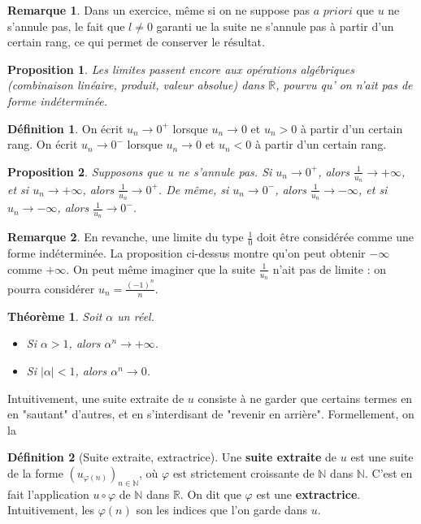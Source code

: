\documentclass[french]{book}
\newcommand{\N}{\mathbb{N}}
\newcommand{\R}{\mathbb{R}}
\theoremstyle{plain}
\newtheorem{thm}{Théorème}[chapter]
\newtheorem{prop}{Proposition}[chapter]
\theoremstyle{definition}
\newtheorem{dfn}{Définition}[chapter]
\newtheorem{rmq}{Remarque}[chapter]
\theoremstyle{remark}
\begin{document}
\begin{rmq}
	Dans un exercice, même si on ne suppose pas $a$ $priori$ que $u$ ne s'annule pas, le fait que $l\ne0$ garanti ue la suite ne s'annule pas à partir d'un certain rang, ce qui permet de conserver le résultat.
\end{rmq}
\begin{prop}
	Les limites passent encore aux opérations algébriques (combinaison linéaire, produit, valeur absolue) dans $\overline{\R}$, pourvu qu' on n'ait pas de forme indéterminée.
\end{prop}
\begin{dfn}
	On écrit $u_n\rightarrow0^+$ lorsque $u_n\rightarrow0$ et $u_n>0$ à partir d'un certain rang. On écrit $u_n\rightarrow0^-$ lorsque $u_n\rightarrow0$ et $u_n<0$ à partir d'un certain rang.
\end{dfn}
\begin{prop}
	Supposons que $u$ ne s'annule pas. Si $u_n\rightarrow0^+$, alors $\displaystyle\frac{1}{u_n}\rightarrow+\infty$, et si $u_n\rightarrow+\infty$, alors $\displaystyle\frac{1}{u_n}\rightarrow0^+$. De même, si $u_n\rightarrow0^-$, alors $\displaystyle\frac{1}{u_n}\rightarrow-\infty$, et si $u_n\rightarrow-\infty$, alors $\displaystyle\frac{1}{u_n}\rightarrow0^-
	$.
\end{prop}
\begin{rmq}
	En revanche, une limite du type $\displaystyle\frac10$ doit être considérée comme une forme indéterminée. La proposition ci-dessus montre qu'on peut obtenir $-\infty$ comme $+\infty$. On peut même imaginer que la suite $\displaystyle\frac{1}{u_n}$ n'ait pas de limite : on pourra considérer $\displaystyle u_n=\frac{(-1)^n}{n}$.
\end{rmq}
\begin{thm}
	Soit $\alpha$ un réel.
	\begin{itemize}
		\item Si $\alpha>1$, alors $\alpha^n\rightarrow+\infty$.
		\item Si $\lvert\alpha\rvert<1$, alors $\alpha^n\rightarrow0$.
	\end{itemize}
\end{thm}
Intuitivement, une suite extraite de $u$ consiste à ne garder que certains termes en en "sautant" d'autres, et en s'interdisant de "revenir en arrière". Formellement, on la 
\begin{dfn}[Suite extraite, extractrice]
	Une \textbf{suite extraite} de $u$ est une suite de la forme $(u_{\varphi(n)})_{n\in\N}$, où $\varphi$ est strictement croissante de $\N$ dans $\N$. C'est en fait l'application $u\circ\varphi$ de $\N$ dans $\R$. On dit que $\varphi$ est une \textbf{extractrice}. Intuitivement, les $\varphi(n)$ son les indices que l'on garde dans $u$.
\end{dfn}
\end{document}
